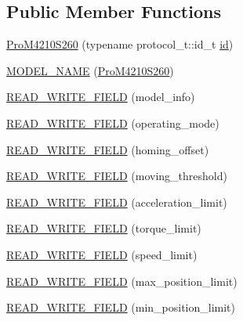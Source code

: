 \subsection*{Public Member Functions}
\begin{DoxyCompactItemize}
\item 
\hyperlink{classdynamixel_1_1servos_1_1_pro_m4210_s260_ad29a29cf2de07386cf811a5972fd958f}{Pro\+M4210\+S260} (typename protocol\+\_\+t\+::id\+\_\+t \hyperlink{classdynamixel_1_1servos_1_1_servo_a2d022081672e25a7bb57b76706e1cc57}{id})
\item 
\hyperlink{classdynamixel_1_1servos_1_1_pro_m4210_s260_a0a58e4e3fbaf225e446eb4bcc3364c9a}{M\+O\+D\+E\+L\+\_\+\+N\+A\+ME} (\hyperlink{classdynamixel_1_1servos_1_1_pro_m4210_s260}{Pro\+M4210\+S260})
\item 
\hyperlink{classdynamixel_1_1servos_1_1_pro_m4210_s260_a17b72c0cf7e912b3ccdac1001d7e1b36}{R\+E\+A\+D\+\_\+\+W\+R\+I\+T\+E\+\_\+\+F\+I\+E\+LD} (model\+\_\+info)
\item 
\hyperlink{classdynamixel_1_1servos_1_1_pro_m4210_s260_a6fbc443a66d743af0e99cfaf2357f3c3}{R\+E\+A\+D\+\_\+\+W\+R\+I\+T\+E\+\_\+\+F\+I\+E\+LD} (operating\+\_\+mode)
\item 
\hyperlink{classdynamixel_1_1servos_1_1_pro_m4210_s260_a82c93b24800b34201b67241bf5691052}{R\+E\+A\+D\+\_\+\+W\+R\+I\+T\+E\+\_\+\+F\+I\+E\+LD} (homing\+\_\+offset)
\item 
\hyperlink{classdynamixel_1_1servos_1_1_pro_m4210_s260_afc979fc03811025e03e2f60efac185bc}{R\+E\+A\+D\+\_\+\+W\+R\+I\+T\+E\+\_\+\+F\+I\+E\+LD} (moving\+\_\+threshold)
\item 
\hyperlink{classdynamixel_1_1servos_1_1_pro_m4210_s260_a59848db7fa95092352678a9675b553d6}{R\+E\+A\+D\+\_\+\+W\+R\+I\+T\+E\+\_\+\+F\+I\+E\+LD} (acceleration\+\_\+limit)
\item 
\hyperlink{classdynamixel_1_1servos_1_1_pro_m4210_s260_ad56db1d0eff11fbc8907f9dd0a491edc}{R\+E\+A\+D\+\_\+\+W\+R\+I\+T\+E\+\_\+\+F\+I\+E\+LD} (torque\+\_\+limit)
\item 
\hyperlink{classdynamixel_1_1servos_1_1_pro_m4210_s260_a932d62be86ed5320e86f6b7890cf5f05}{R\+E\+A\+D\+\_\+\+W\+R\+I\+T\+E\+\_\+\+F\+I\+E\+LD} (speed\+\_\+limit)
\item 
\hyperlink{classdynamixel_1_1servos_1_1_pro_m4210_s260_a2b7f16479b9d1547bb95253b0420fa47}{R\+E\+A\+D\+\_\+\+W\+R\+I\+T\+E\+\_\+\+F\+I\+E\+LD} (max\+\_\+position\+\_\+limit)
\item 
\hyperlink{classdynamixel_1_1servos_1_1_pro_m4210_s260_a173eb9606c514651c77d2362222566d3}{R\+E\+A\+D\+\_\+\+W\+R\+I\+T\+E\+\_\+\+F\+I\+E\+LD} (min\+\_\+position\+\_\+limit)

\end{DoxyCompactItemize}
